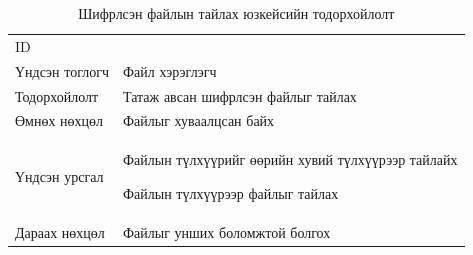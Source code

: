 \begin{table}
    \label{tab:treatments}
    \footnotesize
    \centering
    \begin{tabularx}{\textwidth}{|>{\hsize=0.3\hsize}X|>{\hsize=0.7\hsize}X|}
        \hline
        \multicolumn{2}{|c|}{Шифрлсэн файлын тайлах} \\
        \hline
        ID & 7 \\
        \hline
        Үндсэн тоглогч & Файл хэрэглэгч\\
        \hline
        Тодорхойлолт & Татаж авсан шифрлсэн файлыг тайлах\\
        \hline
        Өмнөх нөхцөл & Файлыг хуваалцсан байх\\
        \hline
        Үндсэн урсгал & 
        \item Файлын түлхүүрийг өөрийн хувий түлхүүрээр тайлайх
        \item Файлын түлхүүрээр файлыг тайлах\\
        \hline
        Дараах нөхцөл & Файлыг унших боломжтой болгох\\
        \hline
    \end{tabularx}
    \caption{Шифрлсэн файлын тайлах юзкейсийн тодорхойлолт}
\end{table}





